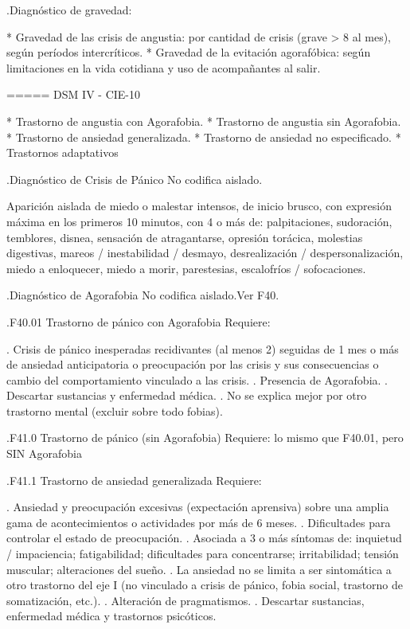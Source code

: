 \documentclass{scrbook}
\begin{document}
.Diagnóstico de gravedad:

* Gravedad de las crisis de angustia: por cantidad de crisis (grave > 8 al mes), según períodos intercríticos.
* Gravedad de la evitación agorafóbica: según limitaciones en la vida cotidiana y uso de acompañantes al salir.

===== DSM IV - CIE-10

* Trastorno de angustia con Agorafobia.
* Trastorno de angustia sin Agorafobia.
* Trastorno de ansiedad generalizada.
* Trastorno de ansiedad no especificado.
* Trastornos adaptativos

.Diagnóstico de Crisis de Pánico
No codifica aislado.

Aparición aislada de miedo o malestar intensos, de inicio brusco, con expresión máxima en los primeros 10 minutos, con 4 o más de: palpitaciones, sudoración, temblores, disnea, sensación de atragantarse, opresión torácica, molestias digestivas, mareos / inestabilidad / desmayo, desrealización / despersonalización, miedo a enloquecer, miedo a morir, parestesias, escalofríos / sofocaciones.

.Diagnóstico de Agorafobia
No codifica aislado.Ver F40.

.F40.01 Trastorno de pánico con Agorafobia
Requiere:

. Crisis de pánico inesperadas recidivantes (al menos 2) seguidas de 1 mes o más de ansiedad anticipatoria o preocupación por las crisis y sus consecuencias o cambio del comportamiento vinculado a las crisis.
. Presencia de Agorafobia.
. Descartar sustancias y enfermedad médica.
. No se explica mejor por otro trastorno mental (excluir sobre todo fobias).

.F41.0 Trastorno de pánico (sin Agorafobia)
Requiere: lo mismo que F40.01, pero SIN Agorafobia

.F41.1 Trastorno de ansiedad generalizada
Requiere:

. Ansiedad y preocupación excesivas (expectación aprensiva) sobre una amplia gama de acontecimientos o actividades por más de 6 meses.
. Dificultades para controlar el estado de preocupación.
. Asociada a 3 o más síntomas de: inquietud / impaciencia; fatigabilidad; dificultades para concentrarse; irritabilidad; tensión muscular; alteraciones del sueño.
. La ansiedad no se limita a ser sintomática a otro trastorno del eje I (no vinculado a crisis de pánico, fobia social, trastorno de somatización, etc.).
. Alteración de pragmatismos.
. Descartar sustancias, enfermedad médica y trastornos psicóticos.
\end{document}
